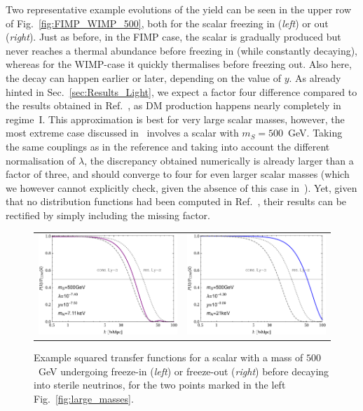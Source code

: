Two representative example evolutions of the yield can be seen in the upper row of Fig.~\ref{fig:FIMP_WIMP_500}, both for the scalar freezing in (\emph{left}) or out (\emph{right}). Just as before, in the FIMP case, the scalar is gradually produced but never reaches a thermal abundance before freezing in (while constantly decaying), whereas for the WIMP-case it quickly thermalises before freezing out. Also here, the decay can happen earlier or later, depending on the value of $y$. As already hinted in Sec.~\ref{sec:Results_Light}, we expect a factor four difference compared to the results obtained in Ref.~\cite{Adulpravitchai:2014xna}, as DM production happens nearly completely in regime~I. This approximation is best for very large scalar masses, however, the most extreme case discussed in~\cite{Adulpravitchai:2014xna} involves a scalar with $m_S = 500$~GeV. Taking the same couplings as in the reference and taking into account the different normalisation of $\lambda$, the discrepancy obtained numerically is already larger than a factor of three, and should converge to four for even larger scalar masses (which we however cannot explicitly check, given the absence of this case in~\cite{Adulpravitchai:2014xna}). Yet, given that no distribution functions had been computed in Ref.~\cite{Adulpravitchai:2014xna}, their results can be rectified by simply including the missing factor.

\begin{figure}[t]
\begin{tabular}{lr}\hspace{-1cm}
 \includegraphics[width=8.3cm]{figures/SquaredTF_mS_500_FIMP.pdf} & \includegraphics[width=8.3cm]{figures/SquaredTF_mS_500_WIMP.pdf}
\end{tabular}
\caption{\label{fig:TF_500}Example squared transfer functions for a scalar with a mass of $500$~GeV undergoing freeze-in (\emph{left}) or freeze-out (\emph{right}) before decaying into sterile neutrinos, for the two points marked in the left Fig.~\ref{fig:large_masses}.}
\end{figure}

